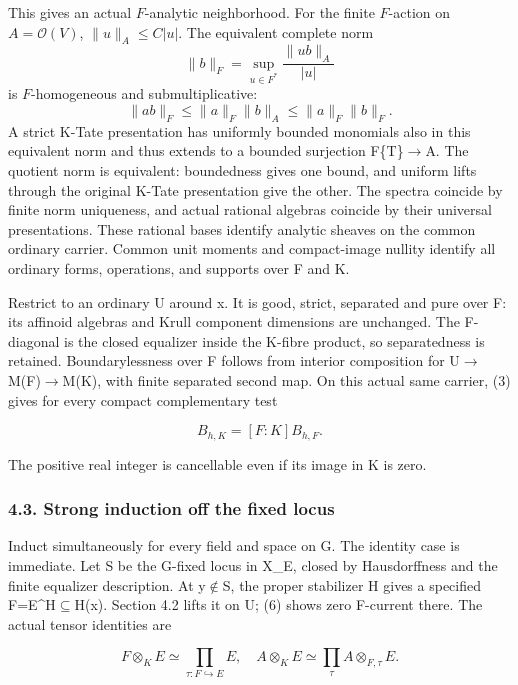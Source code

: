 \documentclass[
  10pt,
]{article}
\begin{document}
This gives an actual \(F\)-analytic neighborhood. For the finite
\(F\)-action on \(A=\mathcal{O}(V)\), \(\|u\|_A\le C|u|\).
The equivalent complete norm
\[
 \|b\|_F=\sup_{u\in F^*}\frac{\|ub\|_A}{|u|}
\]
is \(F\)-homogeneous and submultiplicative:
\[
 \|ab\|_F\le\|a\|_F\|b\|_A\le\|a\|_F\|b\|_F.
\]
A strict K-Tate presentation has uniformly bounded monomials also in
this equivalent norm and thus extends to a bounded surjection F\{T\}\ensuremath{\to}A.
The quotient norm is equivalent: boundedness gives one bound, and
uniform lifts through the original K-Tate presentation give the other.
The spectra coincide by finite norm uniqueness, and actual rational
algebras coincide by their universal presentations. These rational bases
identify analytic sheaves on the common ordinary carrier. Common unit
moments and compact-image nullity identify all ordinary forms,
operations, and supports over F and K.

Restrict to an ordinary U around x. It is good, strict, separated and
pure over F: its affinoid algebras and Krull component dimensions are
unchanged. The F-diagonal is the closed equalizer inside the K-fibre
product, so separatedness is retained. Boundarylessness over F follows
from interior composition for U\ensuremath{\to}M(F)\ensuremath{\to}M(K), with finite separated second
map. On this actual same carrier, (3) gives for every compact
complementary test

\[
                         B_{h,K}=[F:K]B_{h,F}.             \tag{6}
\]

The positive real integer is cancellable even if its image in K is zero.

\subsubsection{4.3. Strong induction off the fixed
locus}\label{strong-induction-off-the-fixed-locus}

Induct simultaneously for every field and space on \textbar G\textbar.
The identity case is immediate. Let S be the G-fixed locus in X\_E,
closed by Hausdorffness and the finite equalizer description. At y\ensuremath{\notin}S,
the proper stabilizer H gives a specified F=E\^{}H\ensuremath{\subseteq}H(x). Section 4.2
lifts it on U; (6) shows zero F-current there. The actual tensor
identities are

\[
 F\otimes_K E\simeq\prod_{\tau:F\hookrightarrow E}E,
 \quad A\otimes_K E\simeq
             \prod_{\tau}A\otimes_{F,\tau}E.                \tag{7}
\]
\end{document}
